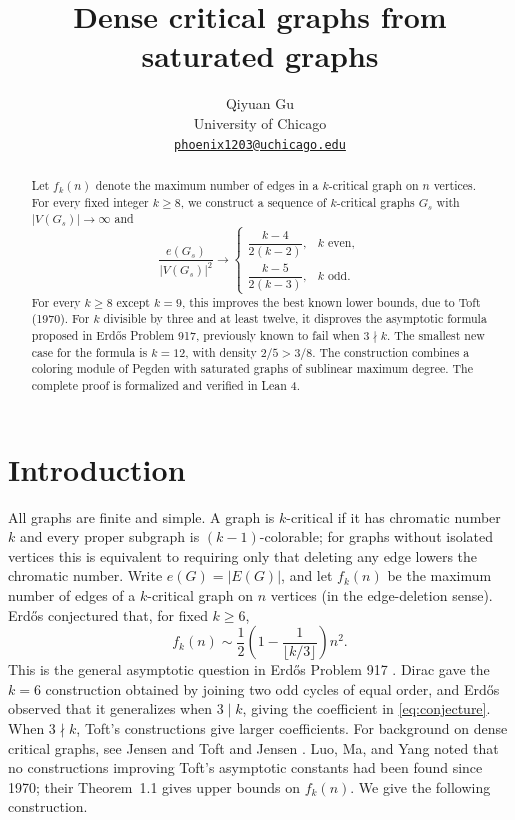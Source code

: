 \documentclass[11pt]{article}
\title{Dense critical graphs from saturated graphs}
\author{Qiyuan Gu\\
University of Chicago\\
\href{mailto:phoenix1203@uchicago.edu}{\texttt{phoenix1203@uchicago.edu}}}
\date{}
\numberwithin{equation}{section}
\begin{document}
\maketitle

\begin{abstract}
Let \(f_k(n)\) denote the maximum number of edges in a \(k\)-critical
graph on \(n\) vertices.
For every fixed integer \(k\ge8\), we construct a sequence of
\(k\)-critical graphs \(G_s\) with \(|V(G_s)|\to\infty\) and
\[
 \frac{e(G_s)}{|V(G_s)|^2}\longrightarrow
 \begin{cases}
 \dfrac{k-4}{2(k-2)},&k\text{ even},\\[4pt]
 \dfrac{k-5}{2(k-3)},&k\text{ odd}.
 \end{cases}
\]
For every \(k\ge8\) except \(k=9\), this improves the best known
lower bounds, due to Toft (1970). For \(k\) divisible by three and
at least twelve, it disproves the asymptotic formula proposed in
Erd\H{o}s Problem 917, previously known to fail when \(3\nmid k\).
The smallest new case for the formula is \(k=12\), with density \(2/5>3/8\).
The construction combines a coloring module of Pegden with
saturated graphs of sublinear maximum degree.
The complete proof is formalized and verified in Lean 4.
\end{abstract}

\section{Introduction}

All graphs are finite and simple. A graph is \(k\)-critical if it has
chromatic number \(k\) and every proper subgraph is \((k-1)\)-colorable;
for graphs without isolated vertices this is equivalent to requiring
only that deleting any edge lowers the chromatic number.
Write \(e(G)=|E(G)|\), and let \(f_k(n)\) be the maximum number
of edges of a \(k\)-critical graph on \(n\) vertices (in the
edge-deletion sense).
Erd\H{o}s \cite[p.~28]{Erdos1969} conjectured that, for fixed \(k\ge6\),
\begin{equation}\label{eq:conjecture}
 f_k(n)\sim\frac12\left(1-\frac1{\lfloor k/3\rfloor}\right)n^2.
\end{equation}
This is the general asymptotic question in Erd\H{o}s Problem 917
\cite{Erdos917}.
Dirac \cite[p.~90]{Dirac1952} gave the \(k=6\) construction obtained by
joining two odd cycles of equal order, and Erd\H{o}s
\cite[p.~28, eq.~(3)]{Erdos1969} observed that it generalizes when
\(3\mid k\), giving the coefficient in \eqref{eq:conjecture}.
When \(3\nmid k\), Toft's constructions \cite{Toft1970} give larger
coefficients. For background on dense critical graphs, see Jensen
and Toft \cite[Section~5.1, pp.~97--98]{JensenToft} and Jensen
\cite{Jensen2002}. Luo, Ma, and Yang \cite{LMY} noted that no
constructions improving Toft's asymptotic constants had been found
since 1970; their Theorem~1.1 gives upper bounds on \(f_k(n)\).
We give the following construction.
\end{document}
